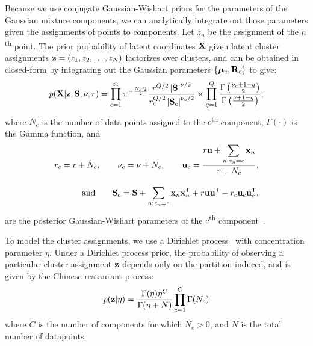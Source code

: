 Because we use conjugate Gaussian-Wishart priors for the parameters of the Gaussian mixture components, we can analytically integrate out those parameters given the assignments of points to components.
Let $z_n$ be the assignment of the $n$\textsuperscript{th} point.
The prior probability of latent coordinates $\mathbf{X}$ given latent cluster assignments ${\bf{z}}=(z_1, z_2, \ldots, z_N)$ factorizes over clusters, and can be obtained in closed-form by integrating out the Gaussian parameters $\{{\boldsymbol{\mu}}_c, \mathbf{R}_c\}$ to give:
%
\begin{align}
p(\mathbf{X} | {\bf{z}}, \mathbf{S}, \nu, r) = \prod_{c=1}^{\infty}
\pi^{-\frac{N_c Q}{2}}\frac{r^{Q/2} \left|\mathbf{S} \right|^{\nu/2}}{r_c^{Q/2} \left| \mathbf{S}_c \right|^{\nu_c/2}}
\times \prod_{q=1}^Q \frac{\Gamma \left( \frac{\nu_c + 1 - q}{2} \right)}{\Gamma \left( \frac{\nu+1-q}{2} \right)},
\label{eq:px_z}
\end{align}
%
where $N_c$ is the number of data points assigned to the $c$\textsuperscript{th} component, $\Gamma(\cdot)$ is the Gamma function, and
%
\begin{align}
r_{c}=r+N_{c},
\hspace{2em}
\nu_{c}=\nu+N_{c}, 
\hspace{2em}
\vu_c=\frac{\displaystyle r\vu + \sum_{n:z_n = c} \vx_n}{r+N_c}, \\[1em]
%
\textnormal{and} \hspace{2em} \vS_{c}=\vS+\sum_{n:z_{n}=c}\vx_{n}\vx_{n}\tra + r\vu\vu\tra
 - r_{c}\vu_{c}\vu_{c}\tra,
\end{align}
%
are the posterior Gaussian-Wishart parameters of the $c$\textsuperscript{th} component~\citep{murphy2007conjugate}.

To model the cluster assignments, we use a Dirichlet process~\citep{maceachern1998estimating} with concentration parameter $\eta$.
Under a Dirichlet process prior, the probability of observing a particular cluster assignment ${\bf{z}}$ depends only on the partition induced, and is given by the Chinese restaurant process:
%
\begin{align}
p({\bf{z}}|\eta) = 
\frac{\Gamma(\eta) \eta^C}{\Gamma(\eta + N)} \prod_{c=1}^C \Gamma( N_c )
\label{eq:pz}
\end{align}
%
where $C$ is the number of components for which $N_c > 0$, and $N$ is the total number of datapoints.


